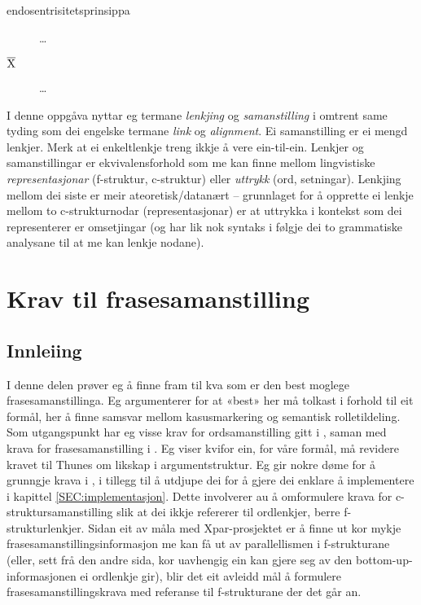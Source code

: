\documentclass[11pt,a4paper,oneside,draft]{book}
\newcommand{\xbar}{$\rm\overline{X}$}
\begin{document}
\begin{description}
\item [endosentrisitetsprinsippa] \ldots{}
\item [\xbar] \ldots{}
\end{description}
 I denne oppgåva nyttar eg termane \emph{lenkjing} og \emph{samanstilling} i
 omtrent same tyding som dei engelske termane \emph{link} og
 \emph{alignment}. Ei samanstilling er ei mengd lenkjer. Merk at ei
 enkeltlenkje treng ikkje å vere ein-til-ein.  Lenkjer og
 samanstillingar er ekvivalensforhold som me kan finne mellom
 lingvistiske \emph{representasjonar} (f-struktur, c-struktur) eller
 \emph{uttrykk} (ord, setningar). Lenkjing mellom dei siste er meir
 ateoretisk/datanært -- grunnlaget for å opprette ei lenkje mellom to
 c-strukturnodar (representasjonar) er at uttrykka i kontekst som dei
 representerer er omsetjingar (og har lik nok syntaks i følgje dei to
 grammatiske analysane til at me kan lenkje nodane).


\chapter{Krav til frasesamanstilling}
\label{sec-3}

\label{SEC:ideell}

\section{Innleiing}
\label{sec-3.1}

I denne delen prøver eg å finne fram til kva som er den best moglege
frasesamanstillinga. Eg argumenterer for at «best» her må tolkast i
forhold til eit formål, her å finne samsvar mellom kasusmarkering og
semantisk rolletildeling. Som utgangspunkt har eg visse krav for
ordsamanstilling gitt i \citet{thunes2003eal}, saman med krava for
frasesamanstilling i \citet{dyvik2009lmp}. Eg viser kvifor ein, for
våre formål, må revidere kravet til Thunes om likskap i
argumentstruktur. Eg gir nokre døme for å grunngje krava i
\citet{dyvik2009lmp}, i tillegg til å utdjupe dei for å gjere dei
enklare å implementere i kapittel \ref{SEC:implementasjon}. Dette
involverer au å omformulere krava for c-struktursamanstilling slik at
dei ikkje refererer til ordlenkjer, berre f-strukturlenkjer. Sidan eit
av måla med Xpar-prosjektet er å finne ut kor mykje
frasesamanstillingsinformasjon me kan få ut av parallellismen i
f-strukturane (eller, sett frå den andre sida, kor uavhengig ein kan
gjere seg av den bottom-up-informasjonen ei ordlenkje gir), blir det
eit avleidd mål å formulere frasesamanstillingskrava med referanse til
f-strukturane der det går an.
\end{document}
